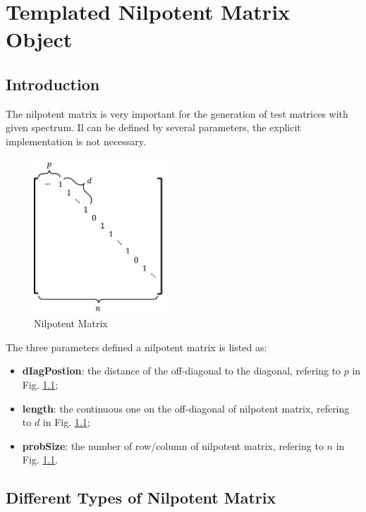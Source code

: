 \documentclass[a4paper, 10 pt]{report}
\begin{document}
	\newpage
	\chapter{Templated  Nilpotent Matrix Object}
	
	\section{Introduction}\label{Introduction_nilp}
	The nilpotent matrix is very important for the generation of test matrices with given spectrum. Il can be defined by several parameters, the explicit implementation is not necessary.
	
	\begin{figure}[htbp]
		\label{fig:nilpotent matrix}
		\caption{Nilpotent Matrix}
		\centering
		\includegraphics[width=5cm]{nilpotent_matrix.pdf}
	\end{figure}

	The three parameters defined a nilpotent matrix is listed as:
	
	\begin{itemize}
		\item \textbf{dIagPostion}: the distance of the off-diagonal to the diagonal, refering to $p$ in Fig. \ref{fig:nilpotent matrix};
		\item \textbf{length}: the continuous one on the off-diagonal of nilpotent matrix, refering to $d$ in Fig. \ref{fig:nilpotent matrix};
		\item \textbf{probSize}: the number of row/column of nilpotent matrix, refering to $n$ in Fig. \ref{fig:nilpotent matrix}.
	\end{itemize}

	\section{Different Types of Nilpotent Matrix}
\end{document}

